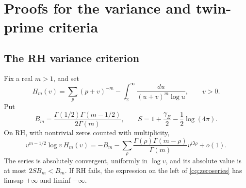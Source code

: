 \section{Proofs for the variance and twin-prime criteria}\label{app:criteria}

\subsection{The RH variance criterion}\label{app:rh-variance}

\begin{lemma}\label{cq:smoothed}
Fix a real \(m>1\), and set
\[
 H_m(v)=\sum_p(p+v)^{-m}
       -\int_2^\infty\frac{du}{(u+v)^m\log u},\qquad v>0.
\]
Put
\[
 B_m=\frac{\Gamma(1/2)\Gamma(m-1/2)}{2\Gamma(m)},\qquad
 S=1+\frac{\gamma_{\!E}}2-\frac12\log(4\pi).
\]
On RH, with nontrivial zeros counted with multiplicity,
\begin{equation}\label{cq:zeroseries}
 v^{m-1/2}\log v\,H_m(v)
 =-B_m-\sum_\rho
 \frac{\Gamma(\rho)\Gamma(m-\rho)}{\Gamma(m)}
 v^{i\Im\rho}+o(1).
\end{equation}
The series is absolutely convergent, uniformly in \(\log v\), and its absolute
value is at most \(2SB_m<B_m\). If RH fails, the expression on the left of
\eqref{cq:zeroseries} has limsup \(+\infty\) and liminf \(-\infty\).
\end{lemma}


